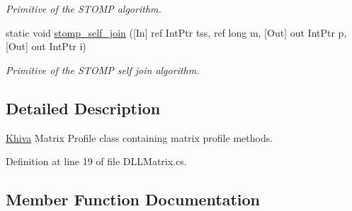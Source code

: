 \begin{DoxyCompactItemize}
\begin{DoxyCompactList}\small\item\em Primitive of the S\+T\+O\+MP algorithm. \end{DoxyCompactList}\item 
static void \mbox{\hyperlink{classkhiva_1_1interop_1_1_d_l_l_matrix_a965e2ee319c1b66e483c2477849d3f83}{stomp\+\_\+self\+\_\+join}} (\mbox{[}In\mbox{]} ref Int\+Ptr tss, ref long m, \mbox{[}Out\mbox{]} out Int\+Ptr p, \mbox{[}Out\mbox{]} out Int\+Ptr i)
\begin{DoxyCompactList}\small\item\em Primitive of the S\+T\+O\+MP self join algorithm. \end{DoxyCompactList}\end{DoxyCompactItemize}


\subsection{Detailed Description}
\mbox{\hyperlink{classkhiva_1_1_khiva}{Khiva}} Matrix Profile class containing matrix profile methods. 



Definition at line 19 of file D\+L\+L\+Matrix.\+cs.



\subsection{Member Function Documentation}
\mbox{\label{classkhiva_1_1interop_1_1_d_l_l_matrix_a44df4cfe48e7ef33f60eda2c88889d1e}} 
